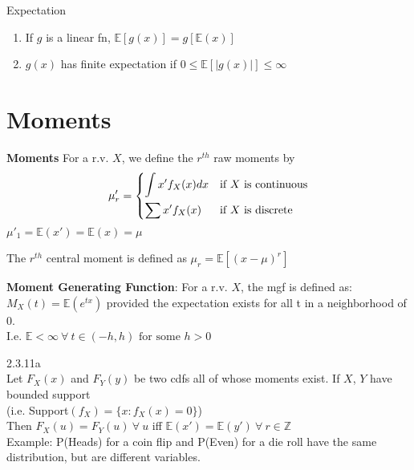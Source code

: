 \documentclass[14pt, oneside, letterpaper, fleqn]{notes}
\begin{document}
\begin{remark} Expectation
	\begin{enumerate}
	\item If $g$ is a linear fn, $\mathbb{E}[g(x)] =
	g[\mathbb{E}(x)]$
	\item $g(x)$ has finite expectation if
	$0 \leq \mathbb{E}[\left| g(x) \right|] \le \infty $
	\end{enumerate}
\end{remark}


\section*{Moments}
\begin{mydef}
	\textbf{Moments} For a r.v. $X$, we define the $r^{th}$
	raw moments by 
	\[ 
		\mu'_r = 
		\begin{dcases}
			\int x'f_X(x)dx 
			& \text{if $X$ is continuous} \\			
			\sum x'f_X(x)
			& \text{if $X$ is discrete}
		\end{dcases}
	\]
	$\mu'_1 = \mathbb{E}(x') = \mathbb{E}(x) = \mu$
\end{mydef}

\begin{mydef}
	The $r^{th}$ central moment is defined as 
	$\mu_r = \mathbb{E}[(x-\mu)^r] $
\end{mydef}

\begin{mydef}
\textbf{Moment Generating Function}: For a r.v. $X$,
the mgf is defined as: $M_X(t) = \mathbb{E}(e^{tx})$ 
provided the expectation exists for all t in a neighborhood
of 0.  \\ 
I.e. $\mathbb{E} < \infty \: \forall \: t \in
(-h,h) \text{ for some } h>0$
\end{mydef}

\begin{theorem} 2.3.11a \\
Let $F_X(x)$ and $F_Y(y)$ be two cdfs all of whose moments
exist.  If $X$, $Y$ have bounded support \\
(i.e. Support$(f_X) = \{x: f_X(x)=0 \}$) \\
Then $F_X(u) = F_Y(u) \: \forall \: u$ iff $\mathbb{E}(x')
= \mathbb{E}(y') \: \forall \: r \in \mathbb{Z}$ \\
Example: P(Heads) for a coin flip and P(Even) for a die
roll have the same distribution, but are different variables.
\end{theorem}
\end{document}
